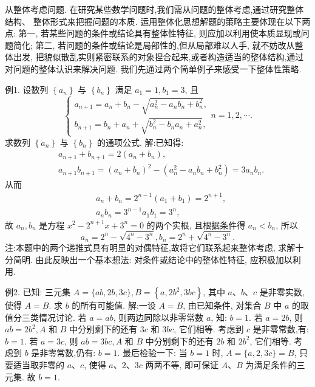 
从整体考虑问题.
在研究某些数学问题时,我们需从问题的整体考虑,通过研究整体结构、 整体形式来把握问题的本质.
运用整体化思想解题的策略主要体现在以下两点:
第一, 若某些问题的条件或结论具有整体性特征, 则应加以利用使本质显现或问题简化;
第二, 若问题的条件或结论是局部性的,但从局部难以人手, 就不妨改从整体出发, 把貌似散乱实则紧密联系的对象捏合起来,或者构造适当的整体结构,通过对问题的整体认识来解决问题.
我们先通过两个简单例子来感受一下整体性策略.



例1. 设数列 $\left\{a_n\right\}$ 与 $\left\{b_n\right\}$ 满足 $a_1=1, b_1=3$, 且
$$
\left\{\begin{array}{l}
a_{n+1}=a_n+b_n-\sqrt{a_n^2-a_n b_n+b_n^2}, \\
b_{n+1}=b_n+a_n+\sqrt{b_n^2-b_n a_n+a_n^2},
\end{array} n=1,2, \cdots .\right.
$$
求数列 $\left\{a_n\right\}$ 与 $\left\{b_n\right\}$ 的通项公式.
解:已知得:
$$
\begin{aligned}
& a_{n+1}+b_{n+1}=2\left(a_n+b_n\right), \\
& a_{n+1} b_{n+1}=\left(a_n+b_n\right)^2-\left(a_n^2-a_n b_n+b_n^2\right)=3 a_n b_n .
\end{aligned}
$$
从而
$$
\begin{aligned}
& a_n+b_n=2^{n-1}\left(a_1+b_1\right)=2^{n+1}, \\
& a_n b_n=3^{n-1} a_1 b_1=3^n,
\end{aligned}
$$
故 $a_n, b_n$ 是方程 $x^2-2^{n+1} x+3^n=0$ 的两个实根, 且根据条件得 $a_n<b_n$, 所以
$$
a_n=2^n-\sqrt{4^n-3^n}, b_n=2^n+\sqrt{4^n-3^n} .
$$
注:本题中的两个递推式具有明显的对偶特征,故将它们联系起来整体考虑, 求解十分简明.
由此反映出一个基本想法: 对条件或结论中的整体性特征, 应积极加以利用.



例2. 已知: 三元集 $A=\{a b, 2 b, 3 c\}, B=\left\{a, 2 b^2, 3 b c\right\}$, 其中 $a 、 b 、 c$ 是非零实数,使得 $A=B$. 求 $b$ 的所有可能值.
解:一设 $A=B$, 由已知条件, 对集合 $B$ 中 $a$ 的取值分三类情况讨论.
若 $a=a b$, 则两边同除以非零常数 $a$, 知: $b=1$.
若 $a=2 b$, 则 $a b=2 b^2, A$ 和 $B$ 中分别剩下的还有 $3 c$ 和 $3 b c$, 它们相等.
考虑到 $c$ 是非零常数,有: $b=1$.
若 $a=3 c$, 则 $a b=3 b c, A$ 和 $B$ 中分别剩下的还有 $2 b$ 和 $2 b^2$, 它们相等.
考虑到 $b$ 是非零常数,仍有: $b=1$.
最后检验一下: 当 $b=1$ 时, $A=\{a, 2,3 c\}=B$, 只要适当取非零的 $a 、 c$, 使得 $a 、 2 、 3 c$ 两两不等, 即可保证 $A 、 B$ 为满足条件的三元集.
故 $b=1$.



